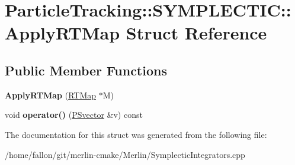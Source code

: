 \hypertarget{structParticleTracking_1_1SYMPLECTIC_1_1ApplyRTMap}{}\section{Particle\+Tracking\+:\+:S\+Y\+M\+P\+L\+E\+C\+T\+IC\+:\+:Apply\+R\+T\+Map Struct Reference}
\label{structParticleTracking_1_1SYMPLECTIC_1_1ApplyRTMap}
\subsection*{Public Member Functions}
\begin{DoxyCompactItemize}
\item 
\mbox{\label{structParticleTracking_1_1SYMPLECTIC_1_1ApplyRTMap_a0040d7c857ac38ca17524b3d09ce69ed}} 
{\bfseries Apply\+R\+T\+Map} (\hyperlink{classRTMap}{R\+T\+Map} $\ast$M)
\item 
\mbox{\label{structParticleTracking_1_1SYMPLECTIC_1_1ApplyRTMap_a11a4445ae9250b725e8f4300a56deacf}} 
void {\bfseries operator()} (\hyperlink{classPSvector}{P\+Svector} \&v) const
\end{DoxyCompactItemize}


The documentation for this struct was generated from the following file\+:\begin{DoxyCompactItemize}
\item 
/home/fallon/git/merlin-\/cmake/\+Merlin/Symplectic\+Integrators.\+cpp\end{DoxyCompactItemize}
